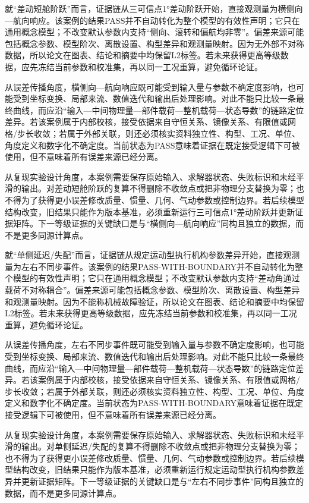\documentclass[UTF8,12pt,openany]{ctexbook}
\begin{document}
就“差动短舱阶跃”而言，证据链从三可信点1°差动阶跃开始，直接观测量为横侧向—航向响应。该案例的结果PASS并不自动转化为整个模型的有效性声明；它只在通用概念模型；不改变默认参数内支持“侧向、滚转和偏航均非零”。偏差来源可能包括概念参数、模型阶次、离散设置、构型差异和观测量映射。因为无外部不对称数据，所以论文在图表、结论和摘要中均保留L2标签。若未来获得更高等级数据，应先冻结当前参数和校准集，再以同一工况重算，避免循环论证。

从误差传播角度，横侧向—航向响应既可能受到输入量与参数不确定度影响，也可能受到坐标变换、局部来流、数值迭代和输出后处理影响。对此不能只比较一条最终曲线，而应沿“输入—中间物理量—部件载荷—整机载荷—状态导数”的链路定位差异。若该案例属于内部校核，接受依据来自守恒关系、镜像关系、有限值或网格/步长收敛；若属于外部关联，则还必须核实资料独立性、构型、工况、单位、角度定义和数字化不确定度。当前状态为PASS意味着证据在既定接受逻辑下可被使用，但不意味着所有误差来源已经分离。

从复现实验设计角度，本案例需要保存原始输入、求解器状态、失败标识和未经平滑的输出。对差动短舱阶跃的复算不得删除不收敛点或把非物理分支替换为零；也不得为了获得更小误差修改质量、惯量、几何、气动参数或控制边界。若后续模型结构改变，旧结果只能作为版本基准，必须重新运行三可信点1°差动阶跃并更新证据矩阵。下一等级证据的关键缺口是与“横侧向—航向响应”同构且独立的数据，而不是更多同源计算点。

就“单侧延迟/失配”而言，证据链从规定运动型执行机构参数差异开始，直接观测量为左右不同步事件。该案例的结果PASS-WITH-BOUNDARY并不自动转化为整个模型的有效性声明；它只在通用概念模型；不改变默认参数内支持“差动角通过载荷不对称耦合”。偏差来源可能包括概念参数、模型阶次、离散设置、构型差异和观测量映射。因为不能称机械故障验证，所以论文在图表、结论和摘要中均保留L2标签。若未来获得更高等级数据，应先冻结当前参数和校准集，再以同一工况重算，避免循环论证。

从误差传播角度，左右不同步事件既可能受到输入量与参数不确定度影响，也可能受到坐标变换、局部来流、数值迭代和输出后处理影响。对此不能只比较一条最终曲线，而应沿“输入—中间物理量—部件载荷—整机载荷—状态导数”的链路定位差异。若该案例属于内部校核，接受依据来自守恒关系、镜像关系、有限值或网格/步长收敛；若属于外部关联，则还必须核实资料独立性、构型、工况、单位、角度定义和数字化不确定度。当前状态为PASS-WITH-BOUNDARY意味着证据在既定接受逻辑下可被使用，但不意味着所有误差来源已经分离。

从复现实验设计角度，本案例需要保存原始输入、求解器状态、失败标识和未经平滑的输出。对单侧延迟/失配的复算不得删除不收敛点或把非物理分支替换为零；也不得为了获得更小误差修改质量、惯量、几何、气动参数或控制边界。若后续模型结构改变，旧结果只能作为版本基准，必须重新运行规定运动型执行机构参数差异并更新证据矩阵。下一等级证据的关键缺口是与“左右不同步事件”同构且独立的数据，而不是更多同源计算点。
\end{document}
